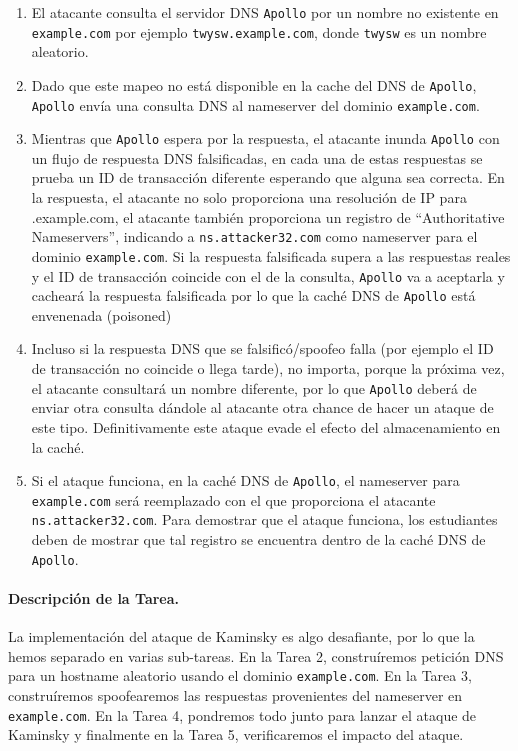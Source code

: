 \begin{enumerate}

\item El atacante consulta el servidor DNS {\tt Apollo} por un nombre no existente en {\tt example.com} por ejemplo {\tt twysw.example.com}, donde {\tt twysw} es un nombre aleatorio.
 
\item Dado que este mapeo no está disponible en la cache del DNS de {\tt Apollo},
{\tt Apollo} envía una consulta DNS al nameserver del dominio  {\tt example.com}.

\item Mientras que {\tt Apollo} espera por la respuesta, el atacante  inunda {\tt Apollo} con un flujo de respuesta DNS falsificadas, en cada una de estas respuestas se prueba un ID de transacción diferente esperando que alguna sea correcta.
En la respuesta, el atacante no solo proporciona una resolución de IP
para {\tttwysw.example.com}, el atacante también proporciona un registro de ``Authoritative Nameservers'', indicando a {\tt ns.attacker32.com} como nameserver para el dominio {\tt example.com}.
Si la respuesta falsificada supera a las respuestas reales y el ID de transacción coincide con el de la consulta, {\tt Apollo} va a aceptarla y cacheará la respuesta falsificada por lo que la caché DNS de {\tt Apollo} está envenenada (poisoned)

\item Incluso si la respuesta DNS que se falsificó/spoofeo falla (por ejemplo el ID de transacción no coincide o llega tarde), no importa, porque la próxima vez, el atacante consultará un nombre diferente, por lo que {\tt Apollo} deberá de enviar otra consulta dándole al atacante otra chance de hacer un ataque de este tipo.
Definitivamente este ataque evade el efecto del almacenamiento en la caché.

\item Si el ataque funciona, en la caché DNS de {\tt Apollo}, el nameserver para {\tt example.com} será reemplazado con el que proporciona el atacante {\tt ns.attacker32.com}.
Para demostrar que el ataque funciona, los estudiantes deben de mostrar que tal registro se encuentra dentro de la caché DNS de {\tt Apollo}.

\end{enumerate}


\paragraph{Descripción de la Tarea.} La implementación del ataque de Kaminsky es algo desafiante, por lo que la hemos separado en varias sub-tareas.
En la Tarea 2, construíremos petición DNS para un hostname aleatorio usando el dominio \texttt{example.com}. En la Tarea 3, construíremos spoofearemos las respuestas provenientes del nameserver en \texttt{example.com}. En la Tarea 4, pondremos todo junto para lanzar el ataque de Kaminsky y finalmente en la Tarea 5, verificaremos el impacto del ataque.

